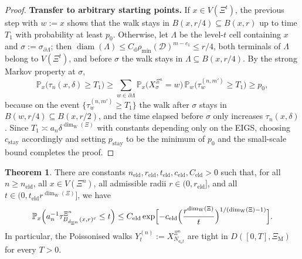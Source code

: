 \documentclass{article}
\theoremstyle{plain}
\theoremstyle{definition}
\newtheorem{theorem}{Theorem}[section]
\newcommand{\dist}{\mathrm{d}}
\newcommand{\dimwalk}{\dim_\mathrm{W}}
\begin{document}
\begin{proof}
\textbf{Transfer to arbitrary starting points.}
If $x\in V(\Xi^{t})$, the previous step with $w:=x$ shows that the walk stays in $B(x,r/4)\subseteq B(x,r)$ up to time $T_1$ with probability at least $p_0$.
Otherwise, let $\Lambda$ be the level-$t$ cell containing $x$ and $\sigma:=\sigma_{\partial\Lambda}$; then $\operatorname{diam}(\Lambda)\le C_{\dist}\rho_{\min}(\mathcal D)^{m-c_1}\le r/4$, both terminals of $\Lambda$ belong to $V(\Xi^{t})$, and before $\sigma$ the walk stays in $\Lambda\subseteq B(x,r/4)$.
By the strong Markov property at $\sigma$,
\[
\mathbb P_x\bigl(\tau_n(x,\delta)\ge T_1\bigr)
\ge
\sum_{w\in\partial\Lambda}\mathbb P_x\bigl(X^{\Xi^n}_{\sigma}=w\bigr)\,\mathbb P_w\bigl(\tau_w^{(n,m')}\ge T_1\bigr)
\ge
p_0,
\]
because on the event $\{\tau_w^{(n,m')}\ge T_1\}$ the walk after $\sigma$ stays in $B(w,r/4)\subseteq B(x,r/2)$, and the time elapsed before $\sigma$ only increases $\tau_n(x,\delta)$.
Since $T_1\asymp a_n\delta^{\dimwalk(\Xi)}$ with constants depending only on the EIGS, choosing $c_{\mathrm{stay}}$ accordingly and setting $p_{\mathrm{stay}}$ to be the minimum of $p_0$ and the small-scale bound completes the proof.%

\end{proof}

\begin{theorem}\label{thm:sec31_discrete_eld_tightness}
There are constants $n_{\mathrm{eld}},r_{\mathrm{eld}},t_{\mathrm{eld}},c_{\mathrm{eld}},C_{\mathrm{eld}}>0$ such that, for all $n\ge n_{\mathrm{eld}}$, all $x\in V(\Xi^n)$, all admissible radii $r\in(0,r_{\mathrm{eld}}]$, and all $t\in(0,t_{\mathrm{eld}}r^{\dimwalk(\Xi)}]$, we have
\[
\mathbb P_x\Bigl(a_n^{-1}\tau_{B_{\hat d_{\Xi^n}}(x,r)^c}^{\Xi^n}\le t\Bigr)
\le
C_{\mathrm{eld}}
\exp\Bigl[-c_{\mathrm{eld}}
\Bigl(\frac{r^{\dimwalk(\Xi)}}{t}\Bigr)^{1/(\dimwalk(\Xi)-1)}\Bigr].
\]
In particular, the Poissonised walks $Y_t^{(n)}:=X_{N_{a_nt}}^{\Xi^n}$ are tight in $D([0,T],\Xi_{\mathrm M})$ for every $T>0$.
\end{theorem}
\end{document}

